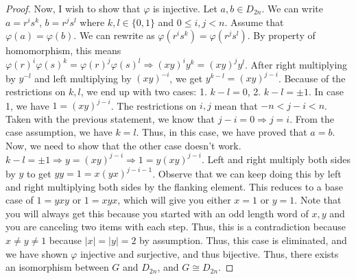 \documentclass{article}
\begin{document}
\begin{proof}
Now, I wish to show that $\varphi$ is injective. Let $a,b \in D_{2n}$.
We can write $a=r^is^k$, $b=r^js^l$ where $k,l \in \{0, 1\}$ and $0 \leq i,j < n$. Assume that $\varphi(a)=\varphi(b)$. We can rewrite as $\varphi(r^is^k)=\varphi(r^js^l)$. 
By property of homomorphism, this means $\varphi(r)^i\varphi(s)^k=\varphi(r)^j\varphi(s)^l \Rightarrow (xy)^i y^k = (xy)^j y^l$. After right multiplying by $y^{-l}$ and left multiplying by $(xy)^{-i}$, we get $y^{k-l}=(xy)^{j-i}$. Because of the restrictions on $k, l$, we end up with two cases: 1. $k-l=0$, 2. $k-l=\pm1$.
In case 1, we have $1=(xy)^{j-i}$. The restrictions on $i, j$ mean that $-n < j-i < n$. Taken with the previous statement, we know that $j-i=0 \Rightarrow j=i$. From the case assumption, we have $k=l$. Thus, in this case, we have proved that $a=b$. Now, we need to show that the other case doesn't work. $k-l=\pm1 \Rightarrow y=(xy)^{j-i} \Rightarrow 1=y(xy)^{j-i}$. Left and right multiply both sides by $y$ to get $yy=1=x(yx)^{j-i-1}$. 
Observe that we can keep doing this by left and right multiplying both sides by the flanking element. This reduces to a base case of $1=yxy$ or $1=xyx$, which will give you either $x=1$ or $y=1$. Note that you will always get this because you started with an odd length word of $x,y$ and you are canceling two items with each step. Thus, this is a contradiction because $x\neq y\neq 1$ because $|x|=|y|=2$ by assumption. Thus, this case is eliminated, and we have shown $\varphi$ injective and surjective, and thus bijective. Thus, there exists an isomorphism between $G$ and $D_{2n}$, and $G \cong D_{2n}$.
\end{proof}
\end{document}
